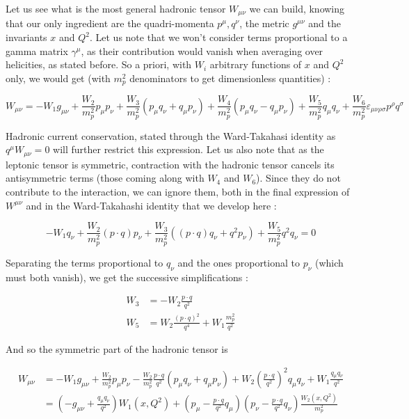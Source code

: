 \documentclass[a4paper,10pt]{report}
\begin{document}
Let us see what is the most general hadronic tensor $W_{\mu \nu}$ we can build, knowing that our only ingredient are
the quadri-momenta $p^{\mu}, q^{\nu}$, the metric $g^{\mu \nu}$ and the invariants $x$ and $Q^2$. Let us note that we won't 
consider terms proportional to a gamma matrix $\gamma^{\mu}$, as their contribution would vanish when averaging over helicities, as 
stated before. So a priori, with $W_i$ arbitrary functions of $x$ and $Q^2$ only, we would get (with $m_p^2$ denominators to get dimensionless 
quantities) :

\begin{equation}
  W_{\mu \nu} = -W_1 g_{\mu \nu} + \frac{W_2}{m^2_p}p_{\mu}p_{\nu} + \frac{W_3}{m^2_p}(p_{\mu}q_{\nu} + q_{\mu}p_{\nu})
  +\frac{W_4}{m^2_p}(p_{\mu}q_{\nu} - q_{\mu}p_{\nu}) + \frac{W_5}{m^2_p}q_{\mu}q_{\nu} + \frac{W_6}{m^2_p}\varepsilon_{\mu \nu \rho \sigma}p^{\rho}q^{\sigma}
\end{equation}

Hadronic current conservation, stated through the Ward-Takahasi identity as $q^{\mu}W_{\mu \nu} = 0$ will further 
restrict this expression. Let us also note that as the leptonic tensor is symmetric, contraction with the hadronic 
tensor cancels its antisymmetric terms (those coming along with $W_4$ and $W_6$). Since they do not contribute to the interaction, we can 
ignore them, both in the final expression of $W^{\mu \nu}$ and in the Ward-Takahashi identity that we develop here : 

\begin{equation}
  - W_1q_{\nu} + \frac{W_2}{m^2_p}(p\cdot q)p_{\nu} + \frac{W_3}{m^2_p}\left((p\cdot q)q_{\nu} + q^2 p_{\nu}\right) + \frac{W_5}{m^2_p}q^2q_{\nu} = 0
\end{equation}

Separating the terms proportional to $q_{\nu}$ and the ones proportional to $p_{\nu}$ (which must both vanish), we get the successive simplifications : 

\begin{align}
  W_3 &= -W_2\frac{p \cdot q}{q^2} \\ 
  W_5 &= W_2\frac{(p\cdot q)^2}{q^4} + W_1\frac{m_p^2}{q^2}
\end{align}

And so the symmetric part of the hadronic tensor is

\begin{align}
  W_{\mu \nu} &= -W_1 g_{\mu \nu} + \frac{W_2}{m^2_p}p_{\mu}p_{\nu} 
  - \frac{W_2}{m^2_p}\frac{p\cdot q}{q^2}\left(p_{\mu}q_{\nu} + q_{\mu}p_{\nu}\right) 
  + W_2\left(\frac{p\cdot q}{q^2}\right)^2 q_\mu q_\nu + W_1\frac{q_\mu q_\nu}{q^2} \nonumber \\
  &= \left(-g_{\mu \nu} + \frac{q_{\mu}q_{\nu}}{q^2}\right)W_1(x,Q^2) 
  + \left(p_{\mu} - \frac{p\cdot q}{q^2}q_{\mu}\right)\left(p_{\nu} - \frac{p\cdot q}{q^2}q_{\nu}\right)\frac{W_2(x,Q^2)}{m^2_p}
\end{align}
\end{document}

